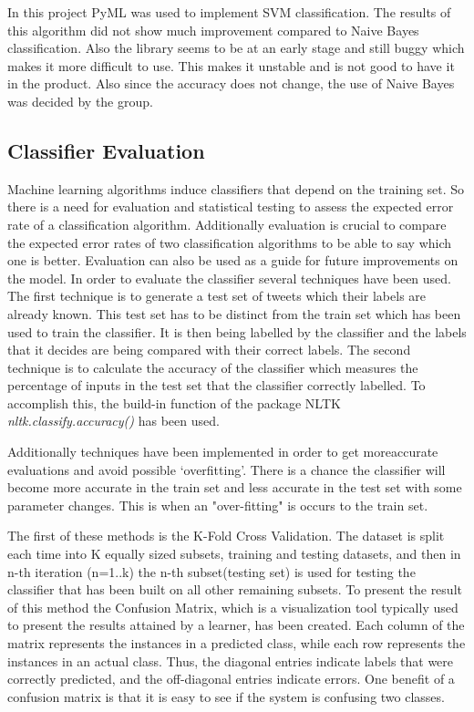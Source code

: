 In this project PyML\cite{website:pyml} was used to implement SVM
classification. The results of this algorithm did not show much improvement
compared to Naive Bayes classification. Also the library seems to be at an
early stage and still buggy which makes it more difficult to use. This makes it
unstable and is not good to have it in the product. Also since the accuracy does not
change, the use of Naive Bayes was decided by the group.

\subsection{Classifier Evaluation} 
Machine learning algorithms induce classifiers that depend on the training set. So there is a need for evaluation and statistical testing to assess the expected error rate of a classification algorithm. Additionally evaluation is crucial to compare the expected error rates of two classification algorithms to be able to say which one is better. Evaluation can also be used as a guide for future improvements on the model. In order to evaluate the classifier several techniques have been used. The first technique is to generate a test set of tweets which their labels are already known. This test set has to be distinct from the train set which has been used to train the classifier. It is then being labelled by the classifier and the labels that it decides are being compared with their correct labels. The second technique is to calculate the accuracy of the classifier which measures the percentage of inputs in the test set that the classifier correctly labelled. To accomplish this, the build-in function of the package NLTK \emph{nltk.classify.accuracy()} has been used.

Additionally techniques have been implemented in order to get moreaccurate evaluations and avoid possible `overfitting'. There is a chance the classifier will become more accurate in the train set and less accurate in the test set with some parameter changes. This is when an "over-fitting" is occurs to the train set. 

The first of these methods is the K-Fold Cross Validation. The dataset is split each time into K equally sized subsets, training and testing datasets, and then in n-th iteration (n=1..k) the n-th subset(testing set) is used for testing the classifier that has been built on all other remaining subsets. To present the result of this method the Confusion Matrix, which is a visualization tool typically used to present the results attained by a learner, has been created. Each column of the matrix represents the instances in a predicted class, while each row represents the instances in an actual class. Thus, the diagonal entries indicate labels that were correctly predicted, and the off-diagonal entries indicate errors. One benefit of a confusion matrix is that it is easy to see if the system is confusing two classes.

